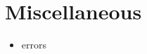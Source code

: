 % 
% 
\chapter{Miscellaneous}
\label{sec:miscellaneous}

\begin{iftex}
\begin{itemize}
\item errors
\end{itemize}
\end{iftex}


